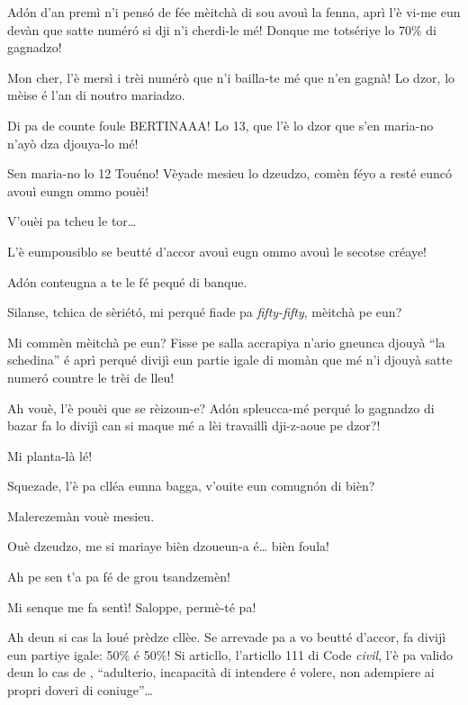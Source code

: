 \begin{drama}
\Tobiespeaks Adón d’an premì n’i pensó de fée mèitchà di sou avouì la fenna, aprì l’è vi-me eun devàn que satte numér\'o si dji n’i cherdi-le mé! Donque me totsériye lo 70$\%$ di gagnadzo!

\Bertinaspeaks Mon cher, l’è mersì i trèi numérò que n’i bailla-te mé que n’en gagnà! Lo dzor, lo mèise é l’an di noutro mariadzo.

\Tobiespeaks Di pa de counte foule BERTINAAA! Lo 13, que l’è lo dzor que s’en maria-no n’ayò dza djouya-lo mé!

\Bertinaspeaks Sen maria-no lo 12 Touéno!  Vèyade mesieu lo dzeudzo, comèn féyo a resté eunc\'o avouì eungn ommo pouèi!

\DzeudzoSenliquerspeaks V'ouèi pa tcheu le tor\ldots

\Bertinaspeaks L’è eumpousiblo se beutté d’accor avouì eugn ommo avouì le secotse créaye!

\Tobiespeaks Adón conteugna a te le fé pequé di banque.

\DzeudzoSenliquerspeaks {} Silanse, tchica de sèriét\'o, mi perqué fiade pa \textit{fifty-fifty}, mèitchà pe eun?

\Tobiespeaks Mi commèn mèitchà pe eun? Fisse pe salla accrapiya n’ario gneunca djouyà ``la schedina'' é aprì perqué divijì eun partie igale di momàn que mé n'i djouyà satte numer\'o countre le trèi de lleu!

\Bertinaspeaks Ah vouè, l’è pouèi que se rèizoun-e? Ad\'on spleucca-mé perqué lo gagnadzo di bazar fa lo divijì can si maque mé a lèi travaillì dji-z-aoue pe dzor?!

\Tobiespeaks Mi planta-là lé!

\DzeudzoSenliquerspeaks {} Squezade, l’è pa clléa eunna bagga, v'ouite eun comugnón di bièn?

\Tobiespeaks Malerezemàn vouè mesieu.

\Bertinaspeaks Ouè dzeudzo, me si mariaye bièn dzoueun-a é\ldots {} bièn foula!

\Tobiespeaks Ah pe sen t’a pa fé de grou tsandzemèn!

\Bertinaspeaks Mi senque me fa sentì! Saloppe, permè-té pa!

\DzeudzoSenliquerspeaks {} Ah deun si cas la loué prèdze cllèe. Se arrevade pa a vo beutté d’accor, fa divijì eun partiye igale: 50$\%$ é 50$\%$! Si articllo, l’articllo 111 di Code \textit{civil}, l’è pa valido deun lo cas de , ``adulterio, incapacità di intendere é volere, non adempiere ai propri doveri di coniuge''\ldots


\end{drama}
